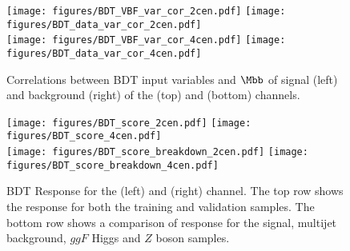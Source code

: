 \begin{figure}[htbp]
  \centering
 \texttt{[image: figures/BDT\_VBF\_var\_cor\_2cen.pdf]}
 \texttt{[image: figures/BDT\_data\_var\_cor\_2cen.pdf]}\\
 \texttt{[image: figures/BDT\_VBF\_var\_cor\_4cen.pdf]}
 \texttt{[image: figures/BDT\_data\_var\_cor\_4cen.pdf]}\\
\caption{Correlations between BDT input variables and $\Mbb$ of signal (left) and background (right) of  the \twocentral (top) and \fourcentral (bottom) channels.}
  \label{fig:BDTInputsCor}
\end{figure}

\begin{figure}[htbp]
  \centering
 \texttt{[image: figures/BDT\_score\_2cen.pdf]}
 \texttt{[image: figures/BDT\_score\_4cen.pdf]}\\
 \texttt{[image: figures/BDT\_score\_breakdown\_2cen.pdf]}
 \texttt{[image: figures/BDT\_score\_breakdown\_4cen.pdf]}\\
\caption{BDT Response for  the \twocentral (left) and \fourcentral (right) channel.  The top row shows the response for both the training and validation samples.  The bottom row shows a comparison of response for the signal, multijet background, $ggF$ Higgs and $Z$ boson samples. }
  \label{fig:BDTResponse}
\end{figure}


